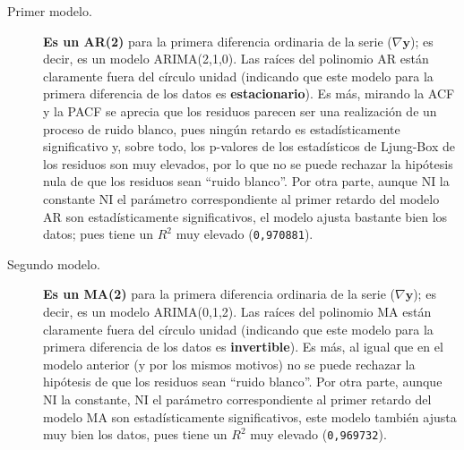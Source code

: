 \documentclass[10pt]{article}
\begin{document}
\begin{description}
\item[{Primer modelo.}] \textbf{Es un AR(2)} para la primera diferencia ordinaria
de la serie (\(\nabla \mathbf{y}\)); es decir, es un modelo
ARIMA(2,1,0). Las raíces del polinomio AR están claramente fuera del
círculo unidad (indicando que este modelo para la primera diferencia
de los datos es \textbf{estacionario}). Es más, mirando la ACF y la PACF se
aprecia que los residuos parecen ser una realización de un proceso
de ruido blanco, pues ningún retardo es estadísticamente
significativo y, sobre todo, los p-valores de los estadísticos de
Ljung-Box de los residuos son muy elevados, por lo que no se puede
rechazar la hipótesis nula de que los residuos sean ``ruido
blanco''. Por otra parte, aunque NI la constante NI el parámetro
correspondiente al primer retardo del modelo AR son estadísticamente
significativos, el modelo ajusta bastante bien los datos; pues tiene
un \(R^2\) muy elevado (\texttt{0,970881}).

\item[{Segundo modelo.}] \textbf{Es un MA(2)} para la primera diferencia
ordinaria de la serie (\(\nabla \mathbf{y}\)); es decir, es un modelo
ARIMA(0,1,2). Las raíces del polinomio MA están claramente fuera del
círculo unidad (indicando que este modelo para la primera diferencia
de los datos es \textbf{invertible}). Es más, al igual que en el modelo
anterior (y por los mismos motivos) no se puede rechazar la
hipótesis de que los residuos sean ``ruido blanco''. Por otra parte,
aunque NI la constante, NI el parámetro correspondiente al primer
retardo del modelo MA son estadísticamente significativos, este
modelo también ajusta muy bien los datos, pues tiene un \(R^2\) muy
elevado (\texttt{0,969732}).
\end{description}
\end{document}
